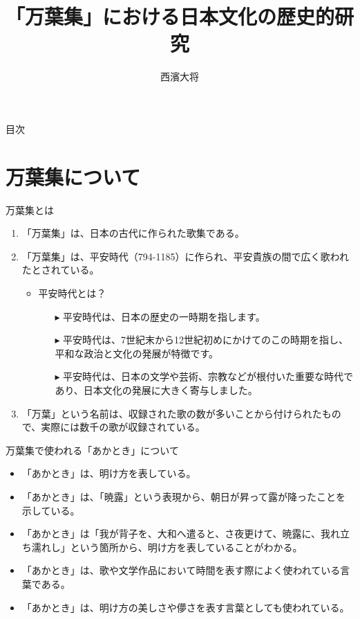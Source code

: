 \documentclass[dvipdfmx, 11pt]{beamer}
\title{「万葉集」における日本文化の歴史的研究}
\author{西濱大将}
\begin{document}
	\begin{frame}
		\titlepage
	\end{frame}
	\begin{frame}{目次}
		\tableofcontents
	\end{frame}
	\section{万葉集について}
	\begin{frame}{万葉集とは}
		\begin{enumerate}
			\item 「万葉集」は、日本の古代に作られた歌集である。
			\item 「万葉集」は、平安時代（794-1185）に作られ、平安貴族の間で広く歌われたとされている。
			\begin{itemize}
				\item 平安時代とは？
				\begin{itemize}
					\item[$\blacktriangleright$] 平安時代は、日本の歴史の一時期を指します。
					\item[$\blacktriangleright$] 平安時代は、7世紀末から12世紀初めにかけてのこの時期を指し、平和な政治と文化の発展が特徴です。
					\item[$\blacktriangleright$] 平安時代は、日本の文学や芸術、宗教などが根付いた重要な時代であり、日本文化の発展に大きく寄与しました。
				\end{itemize}
			\end{itemize}
			\item 「万葉」という名前は、収録された歌の数が多いことから付けられたもので、実際には数千の歌が収録されている。
		\end{enumerate}
	\end{frame}
	
	\begin{frame}{万葉集で使われる「あかとき」について}
		\begin{itemize}
			\item 「あかとき」は、明け方を表している。
			\item 「あかとき」は、「暁露」という表現から、朝日が昇って露が降ったことを示している。
			\item 「あかとき」は「我が背子を、大和へ遣ると、さ夜更けて、暁露に、我れ立ち濡れし」という箇所から、明け方を表していることがわかる。
			\item 「あかとき」は、歌や文学作品において時間を表す際によく使われている言葉である。
			\item 「あかとき」は、明け方の美しさや儚さを表す言葉としても使われている。
		\end{itemize}
	\end{frame}
	
\end{document}
